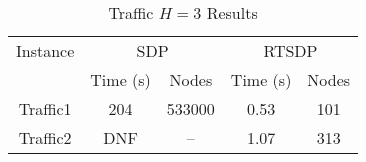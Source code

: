 \begin{table}
\centering
\begin{tabular}{c|cc|cc}
	\toprule
	Instance	 & \multicolumn{2}{c|}{SDP} & \multicolumn{2}{c}{RTSDP}  \\  \cmidrule{2-5}
	 & Time (s) & Nodes & Time (s) & Nodes \\ \bottomrule
	Traffic1  & 204 & 533000 & 0.53 & 101\\
	Traffic2  & DNF & -- & 1.07 & 313\\ \midrule
\end{tabular}
\caption{Traffic $H = 3$ Results}
\label{tab:trah3}
\end{table}

